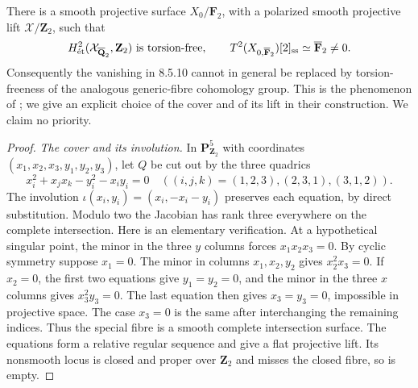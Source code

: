 \begin{theorem}\label{thm:A-BMS-counterexample}
 There is a smooth
projective surface $X_0/\mathbf F_2$, with a polarized smooth
projective lift $\mathcal X/\mathbf Z_2$, such that
\[
 H^2_{\et}(\mathcal X_{\overline{\mathbf Q}_2},\mathbf Z_2)
 \text{ is torsion-free},\qquad
 T^2(X_{0,\overline{\mathbf F}_2})[2]_{\ss}\simeq
 \overline{\mathbf F}_2\ne0.
\]
Consequently the vanishing in 8.5.10 cannot in general be replaced by
torsion-freeness of the analogous generic-fibre cohomology group.
This is the phenomenon of \citet[Theorem 2.1 and Remark 2.3]{BMS2016};
we give an explicit choice of the cover and of its lift in their
construction.  We claim no priority.
\end{theorem}
\begin{proof}
\emph{The cover and its involution.}
In $\mathbf P^5_{\mathbf Z_2}$ with coordinates
$(x_1,x_2,x_3,y_1,y_2,y_3)$, let $Q$ be cut out by the three quadrics
\begin{equation}\label{eq:A-K3-quadrics}
 x_i^2+x_jx_k-y_i^2-x_iy_i=0\quad
 ((i,j,k)=(1,2,3),(2,3,1),(3,1,2)).
\end{equation}
The involution
$\iota(x_i,y_i)=(x_i,-x_i-y_i)$ preserves each equation, by direct
substitution.  Modulo two the Jacobian has rank three everywhere on
the complete intersection.  Here is an elementary verification.
At a hypothetical singular point, the minor in the three $y$ columns
forces $x_1x_2x_3=0$.  By cyclic symmetry suppose $x_1=0$.
The minor in columns $x_1,x_2,y_2$ gives $x_2^2x_3=0$.
If $x_2=0$, the first two equations give $y_1=y_2=0$, and the minor
in the three $x$ columns gives $x_3^2y_3=0$.  The last equation then
gives $x_3=y_3=0$, impossible in projective space.  The case $x_3=0$
is the same after interchanging the remaining indices.
Thus the special fibre is a smooth complete intersection surface.
The equations form a relative regular sequence and give a flat
projective lift.  Its nonsmooth locus is closed and proper over
$\mathbf Z_2$ and misses the closed fibre, so is empty.


\end{proof}
